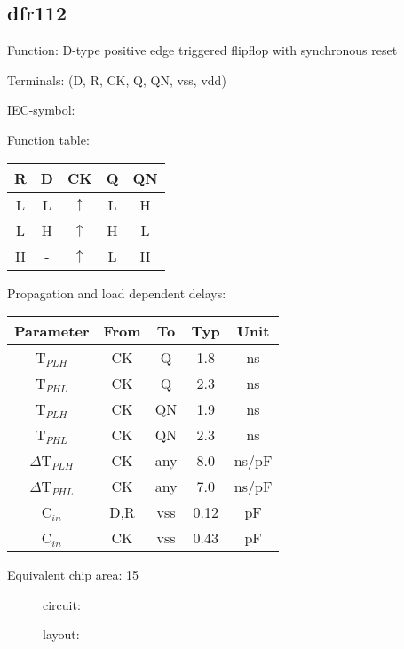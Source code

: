 \subsection{dfr112}
Function: D-type positive edge triggered flipflop with synchronous reset

Terminals: (D, R, CK, Q, QN, vss, vdd)


IEC-symbol:
\begin{figure}[bth]
\end{figure}

Function table:
\begin{table}[bth]
\begin{tabular}{|c|c|c||c|c|}
\hline
R	&D	&CK		&Q	&QN\\
\hline
L	&L	&$\uparrow$	&L	&H\\
L	&H	&$\uparrow$	&H	&L\\
H	&-	&$\uparrow$	&L	&H\\
\hline
\end{tabular}
\vspace{1cm}

Propagation and load dependent delays:\\

\begin{tabular}{|c|c|c|c|c|}
\hline
Parameter               &From            &To   &Typ    &Unit\\
\hline
T$_{PLH}$               &CK     	&Q      &1.8    &ns\\
T$_{PHL}$               &CK    		&Q      &2.3    &ns\\
T$_{PLH}$               &CK     	&QN     &1.9    &ns\\
T$_{PHL}$               &CK    		&QN     &2.3    &ns\\
\hline
$\Delta$T$_{PLH}$       &CK          	&any    &8.0    &ns/pF\\
$\Delta$T$_{PHL}$       &CK           	&any    &7.0    &ns/pF\\
\hline
C$_{in}$                &D,R	    	&vss    &0.12   &pF\\
C$_{in}$                &CK	    	&vss    &0.43   &pF\\
\hline
\end{tabular}
\end{table}

Equivalent chip area: 15


\begin{figure}[t]
circuit:\\



layout:\\

\end{figure}


\clearpage
